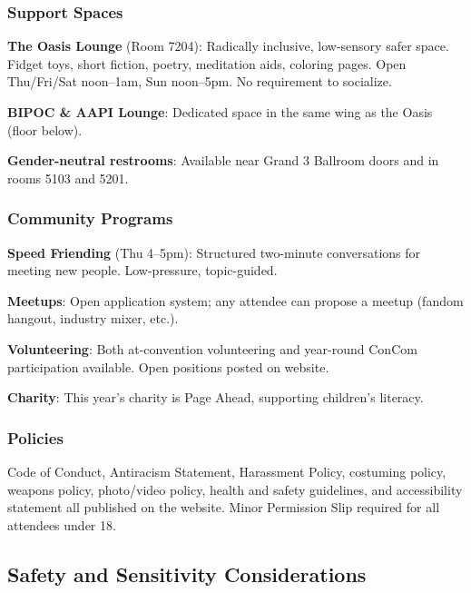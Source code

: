 \documentclass[11pt,letterpaper]{article}
\begin{document}
\subsubsection{Support Spaces}

\textbf{The Oasis Lounge} (Room 7204): Radically inclusive, low-sensory safer space. Fidget toys, short fiction, poetry, meditation aids, coloring pages. Open Thu/Fri/Sat noon--1am, Sun noon--5pm. No requirement to socialize.

\textbf{BIPOC \& AAPI Lounge}: Dedicated space in the same wing as the Oasis (floor below).

\textbf{Gender-neutral restrooms}: Available near Grand 3 Ballroom doors and in rooms 5103 and 5201.

\subsubsection{Community Programs}

\textbf{Speed Friending} (Thu 4--5pm): Structured two-minute conversations for meeting new people. Low-pressure, topic-guided.

\textbf{Meetups}: Open application system; any attendee can propose a meetup (fandom hangout, industry mixer, etc.).

\textbf{Volunteering}: Both at-convention volunteering and year-round ConCom participation available. Open positions posted on website.

\textbf{Charity}: This year's charity is Page Ahead, supporting children's literacy.

\subsubsection{Policies}

Code of Conduct, Antiracism Statement, Harassment Policy, costuming policy, weapons policy, photo/video policy, health and safety guidelines, and accessibility statement all published on the website. Minor Permission Slip required for all attendees under 18.

\subsection{Safety and Sensitivity Considerations}
\end{document}
